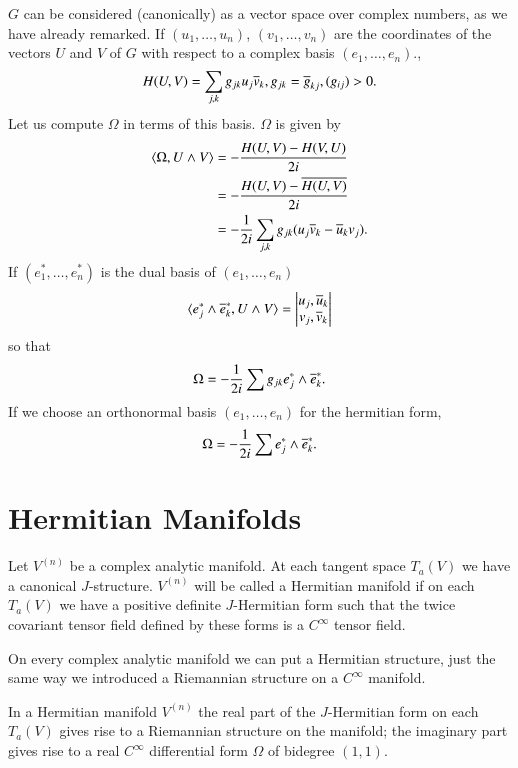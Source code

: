 $G$ can be considered (canonically) as a vector space over complex
numbers, as we have already remarked. If $(u_{1},\ldots,u_{n})$,
$(v_{1},\ldots,v_{n})$ are the coordinates of the vectors $U$ and $V$
of $G$ with respect to a complex basis $(e_{1},\ldots,e_{n})$.,
$$
H(U,V)=\sum_{j,k}g_{jk}u_{j}\overline{v}_{k},g_{jk}=\overline{g}_{kj},(g_{ij})>0.
$$
Let us compute $\Omega$ in terms of this basis. $\Omega$ is given by
\begin{align*}
\langle \Omega, U\wedge V\rangle &= -\frac{H(U,V)-H(V,U)}{2i}\\
&= -\frac{H(U,V)-\overline{H(U,V)}}{2i}\\
&=-\frac{1}{2i}\sum_{j,k}g_{jk}(u_{j}\overline{v}_{k}-\overline{u}_{k}v_{j}).
\end{align*}
If $(e^{\ast}_{1},\ldots,e^{\ast}_{n})$ is the dual basis of
$(e_{1},\ldots,e_{n})$ 
$$
\langle e^{\ast}_{j}\wedge\overline{e}^{\ast}_{k}, U\wedge V\rangle=
\begin{vmatrix}
u_{j},\overline{u}_{k}\\
v_{j},\overline{v}_{k}
\end{vmatrix}
$$\pageoriginale
so that
$$
\Omega=-\frac{1}{2i}\sum g_{jk}e^{\ast}_{j}\wedge \overline{e}_{k}^{\ast}.
$$
If we choose an orthonormal basis $(e_{1},\ldots,e_{n})$ for the
hermitian form,
$$
\Omega=-\frac{1}{2i}\sum e^{\ast}_{j}\wedge \overline{e}^{\ast}_{k}.
$$

\section*{Hermitian Manifolds}

Let $V^{(n)}$ be a complex analytic manifold. At each tangent space
$T_{a}(V)$ we have a canonical $J$-structure. $V^{(n)}$ will be called
a Hermitian manifold if on each $T_{a}(V)$ we have a positive definite
$J$-Hermitian form such that the twice covariant tensor field defined
by these forms is a $C^{\infty}$ tensor field.

On every complex analytic manifold we can put a Hermitian structure,
just the same way we introduced a Riemannian structure on a
$C^{\infty}$ manifold.

In a Hermitian manifold $V^{(n)}$ the real part of the $J$-Hermitian
form on each $T_{a}(V)$ gives rise to a Riemannian structure on the
manifold; the imaginary part gives rise to a real $C^{\infty}$
differential form $\Omega$ of bidegree $(1,1)$.

